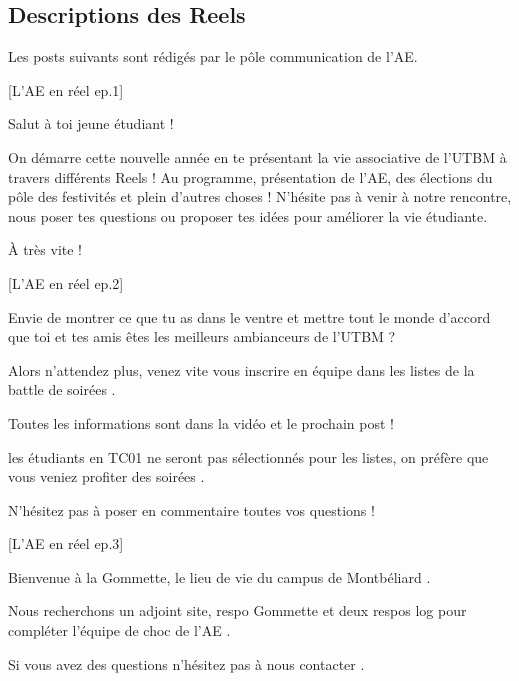 


\subsection*{Descriptions des Reels}\label{subsec:descriptions-reels}

Les posts suivants sont rédigés par le pôle communication de l'\gls{AE}.

[L'\gls{AE} en réel ep.1]

\noindent Salut à toi jeune étudiant !

\noindent On démarre cette nouvelle année en te présentant la vie associative de l'\gls{UTBM} à travers différents Reels !
\noindent Au programme, présentation de l'\gls{AE}, des élections du pôle des festivités et plein d'autres choses !
\noindent N'hésite pas à venir à notre rencontre, nous poser tes questions ou proposer tes idées pour améliorer la vie étudiante.

\noindent À très vite !


[L'\gls{AE} en réel ep.2]

\noindent Envie de montrer ce que tu as dans le ventre et mettre tout le monde d'accord que toi et tes amis êtes les meilleurs ambianceurs de l'\gls{UTBM} ? 

\noindent Alors n'attendez plus, venez vite vous inscrire en équipe dans les listes de la battle de soirées .

\noindent Toutes les informations sont dans la vidéo et le prochain post  !

\noindent {} les étudiants en TC01 ne seront pas sélectionnés pour les listes, on préfère que vous veniez profiter des soirées .

\noindent N'hésitez pas à poser en commentaire toutes vos questions !


[L'\gls{AE} en réel ep.3]

\noindent Bienvenue à la Gommette, le lieu de vie du campus de Montbéliard .

\noindent Nous recherchons un adjoint site, respo Gommette et deux respos log pour compléter l'équipe de choc de l'\gls{AE} .

\noindent Si vous avez des questions n'hésitez pas à nous contacter .

